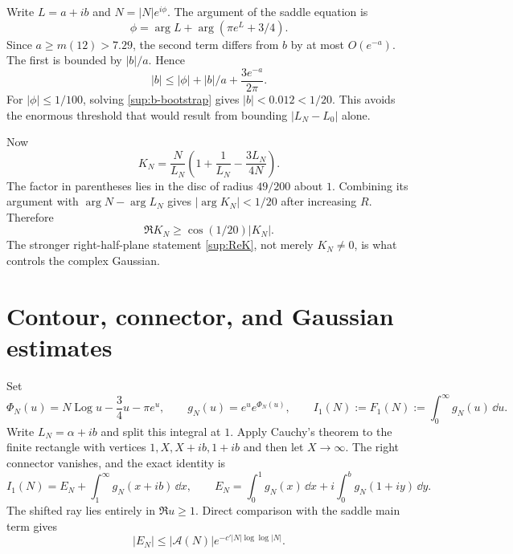 \documentclass[10pt]{article}
\begin{document}
Write $L=a+ib$ and $N=|N|e^{i\phi}$.  The argument of the saddle equation is
\begin{equation}\label{sup:arg-saddle}
 \phi=\arg L+\arg(\pi e^L+3/4).
\end{equation}
Since $a\ge m(12)>7.29$, the second term differs from $b$ by at most
$O(e^{-a})$.  The first is bounded by $|b|/a$.  Hence
\begin{equation}\label{sup:b-bootstrap}
 |b|\le|\phi|+|b|/a+\frac{3e^{-a}}{2\pi}.
\end{equation}
For $|\phi|\le1/100$, solving \eqref{sup:b-bootstrap} gives
$|b|<0.012<1/20$.  This avoids the enormous threshold that would result from
bounding $|L_N-L_0|$ alone.

Now
\[
 K_N=\frac{N}{L_N}\left(1+\frac1{L_N}-\frac{3L_N}{4N}\right).
\]
The factor in parentheses lies in the disc of radius $49/200$ about $1$.
Combining its argument with $\arg N-\arg L_N$ gives
$|\arg K_N|<1/20$ after increasing $R$.  Therefore
\begin{equation}\label{sup:ReK}
 \Re K_N\ge\cos(1/20)|K_N|.
\end{equation}
The stronger right-half-plane statement \eqref{sup:ReK}, not merely
$K_N\ne0$, is what controls the complex Gaussian.

\section{Contour, connector, and Gaussian estimates}\label{sup:contour}

Set
\[
 \Phi_N(u)=N\operatorname{Log}u-\frac34u-\pi e^u,
 \qquad g_N(u)=e^u e^{\Phi_N(u)},
 \qquad I_1(N):=F_1(N):=\int_0^\infty g_N(u)\,\dd u.
\]
Write $L_N=\alpha+ib$ and split this integral at $1$.  Apply
Cauchy's theorem to the finite rectangle with vertices
$1,X,X+ib,1+ib$ and then let $X\to\infty$.  The right connector vanishes,
and the exact identity is
\begin{equation}\label{sup:legal-contour}
 I_1(N)=E_N+\int_1^\infty g_N(x+ib)\,\dd x,
 \qquad
 E_N=\int_0^1g_N(x)\,\dd x+i\int_0^b g_N(1+iy)\,\dd y.
\end{equation}
The shifted ray lies entirely in $\Re u\ge1$.  Direct comparison with the
saddle main term gives
\begin{equation}\label{sup:connector-bound}
 |E_N|\le |\mathcal A(N)|e^{-c'|N|\log\log|N|}.
\end{equation}
\end{document}

